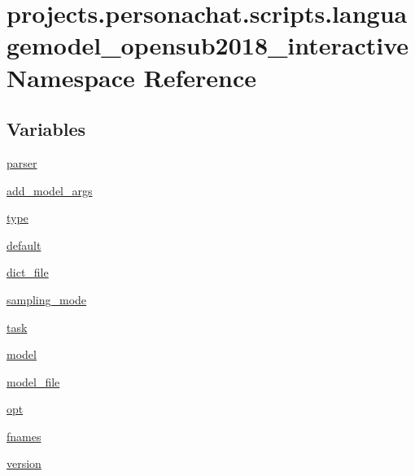 \hypertarget{namespaceprojects_1_1personachat_1_1scripts_1_1languagemodel__opensub2018__interactive}{}\section{projects.\+personachat.\+scripts.\+languagemodel\+\_\+opensub2018\+\_\+interactive Namespace Reference}
\label{namespaceprojects_1_1personachat_1_1scripts_1_1languagemodel__opensub2018__interactive}
\subsection*{Variables}
\begin{DoxyCompactItemize}
\item 
\hyperlink{namespaceprojects_1_1personachat_1_1scripts_1_1languagemodel__opensub2018__interactive_aa76c1419b8143e493636a2f52f499ddb}{parser}
\item 
\hyperlink{namespaceprojects_1_1personachat_1_1scripts_1_1languagemodel__opensub2018__interactive_ad88a5bed4198d710b0da31a97edb10af}{add\+\_\+model\+\_\+args}
\item 
\hyperlink{namespaceprojects_1_1personachat_1_1scripts_1_1languagemodel__opensub2018__interactive_af9985af118825d310d4927cd29e9e5f0}{type}
\item 
\hyperlink{namespaceprojects_1_1personachat_1_1scripts_1_1languagemodel__opensub2018__interactive_a29f50d0b309eba88012286a072b741a9}{default}
\item 
\hyperlink{namespaceprojects_1_1personachat_1_1scripts_1_1languagemodel__opensub2018__interactive_a099498cad277b750be85e76af4780d48}{dict\+\_\+file}
\item 
\hyperlink{namespaceprojects_1_1personachat_1_1scripts_1_1languagemodel__opensub2018__interactive_a8c490ebf95cb3850a9516806061cb38b}{sampling\+\_\+mode}
\item 
\hyperlink{namespaceprojects_1_1personachat_1_1scripts_1_1languagemodel__opensub2018__interactive_ad9f488fe6f59e0c5777e7b9f0c813c7c}{task}
\item 
\hyperlink{namespaceprojects_1_1personachat_1_1scripts_1_1languagemodel__opensub2018__interactive_a9c0dc12d92dcacba837ee1eaece4532f}{model}
\item 
\hyperlink{namespaceprojects_1_1personachat_1_1scripts_1_1languagemodel__opensub2018__interactive_ab98c0243651214d9d6207ffa88e64bc9}{model\+\_\+file}
\item 
\hyperlink{namespaceprojects_1_1personachat_1_1scripts_1_1languagemodel__opensub2018__interactive_a3059bb9bb5a74dff0d505cd53140a28e}{opt}
\item 
\hyperlink{namespaceprojects_1_1personachat_1_1scripts_1_1languagemodel__opensub2018__interactive_a8a29104ceaca14ed17ab45bab673747f}{fnames}
\item 
\hyperlink{namespaceprojects_1_1personachat_1_1scripts_1_1languagemodel__opensub2018__interactive_ac0f798cd57de4f16baadcc1d28678d3b}{version}
\end{DoxyCompactItemize}



